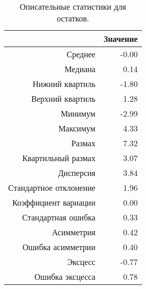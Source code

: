 \begin{table}[ht]
\centering
\begin{tabular}{rr}
  \hline
 & Значение \\ 
  \hline
Среднее & -0.00 \\ 
  Медиана & 0.14 \\ 
  Нижний квартиль & -1.80 \\ 
  Верхний квартиль & 1.28 \\ 
  Минимум & -2.99 \\ 
  Максимум & 4.33 \\ 
  Размах & 7.32 \\ 
  Квартильный размах & 3.07 \\ 
  Дисперсия & 3.84 \\ 
  Стандартное отклонение & 1.96 \\ 
  Коэффициент вариации & 0.00 \\ 
  Стандартная ошибка & 0.33 \\ 
  Асимметрия & 0.42 \\ 
  Ошибка асимметрии & 0.40 \\ 
  Эксцесс & -0.77 \\ 
  Ошибка эксцесса & 0.78 \\ 
   \hline
\end{tabular}
\caption{Описательные статистики для остатков.} 
\label{table:resid_dstats}
\end{table}
